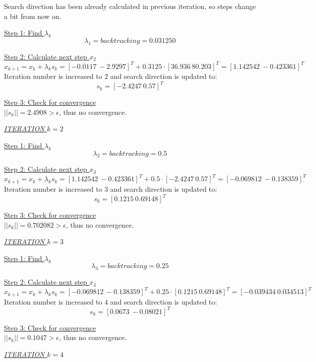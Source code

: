 Search direction has been already calculated in previous iteration, so steps change a bit from now on.

\underline{Step 1: Find $\lambda_k$}
\[
\lambda_1 = \textit{backtracking} = 0.031250
\]

\underline{Step 2: Calculate next step $x_{2}$}
\[
x_{k+1} = x_k + \lambda_k s_k = [-0.0117\  -2.9297]^T + 0.3125 \cdot [36.936\  80.203]^T = [1.142542\ -0.423361]^T
\]
Iteration number is increased to $2$ and search direction is updated to:
\[
s_k = [-2.4247\ 0.57]^T
\]

\underline{Step 3: Check for convergence}\\[2mm]
$||s_k|| = 2.4908 > \epsilon$, thus no convergence.\\[3mm]


\begin{center}
	\underline{\textit{ITERATION} $k=2$}
\end{center}

\underline{Step 1: Find $\lambda_k$}
\[
\lambda_2 = \textit{backtracking} = 0.5
\]

\underline{Step 2: Calculate next step $x_{3}$}
\[
x_{k+1} = x_k + \lambda_k s_k = [1.142542\ -0.423361]^T + 0.5 \cdot [−2.4247\  0.57]^T = [-0.069812\ -0.138359]^T
\]
Iteration number is increased to $3$ and search direction is updated to:
\[
s_k = [0.1215\ 0.69148]^T
\]

\underline{Step 3: Check for convergence}\\[2mm]
$||s_k|| = 0.702082 > \epsilon$, thus no convergence.\\[3mm]


\begin{center}
	\underline{\textit{ITERATION $k=3$}}
\end{center}

\underline{Step 1: Find $\lambda_k$}
\[
\lambda_3 = \textit{backtracking} = 0.25
\]

\underline{Step 2: Calculate next step $x_{4}$}
\[
x_{k+1} = x_k + \lambda_k s_k = [-0.069812\ -0.138359]^T + 0.25 \cdot [0.1215\  0.69148]^T = [-0.039434\ 0.034513]^T
\]
Iteration number is increased to $4$ and search direction is updated to:
\[
s_k = [0.0673\ -0.08021]^T
\]

\underline{Step 3: Check for convergence}\\[2mm]
$||s_k|| = 0.1047 > \epsilon$, thus no convergence.\\[3mm]


\begin{center}
	\underline{\textit{ITERATION $k=4$}}
\end{center}

